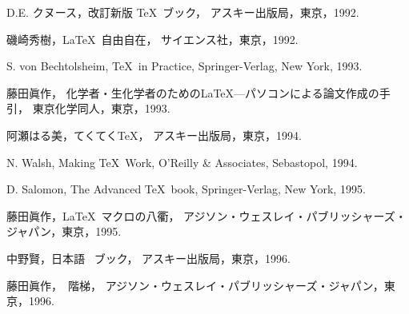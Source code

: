 \documentclass[technicalreport]{ieicej}
\newcommand{\AmSLaTeX}{%
 $\mathcal A$\lower.4ex\hbox{$\!\mathcal M\!$}$\mathcal S$-\LaTeX}
\begin{document}

\begin{thebibliography}{99}





D.E. クヌース，改訂新版 \TeX\ ブック，
アスキー出版局，東京，1992. 

磯崎秀樹，\LaTeX\ 自由自在，
サイエンス社，東京，1992. 


S. von Bechtolsheim, \TeX\ in Practice, 
Springer-Verlag, New York, 1993. 


藤田眞作，
化学者・生化学者のための\LaTeX---パソコンによる論文作成の手引，
東京化学同人，東京，1993. 


阿瀬はる美，てくてく\TeX{}，
アスキー出版局，東京，1994. 

N. Walsh, Making \TeX\ Work, 
O'Reilly \& Associates, Sebastopol, 1994. 

D. Salomon, The Advanced \TeX\ book, 
Springer-Verlag, New York, 1995.

藤田眞作，\LaTeX\ マクロの八衢，
アジソン・ウェスレイ・パブリッシャーズ・ジャパン，東京，1995. 

中野賢，日本語 \LaTeXe\ ブック，
アスキー出版局，東京，1996. 

藤田眞作，\LaTeXe\ 階梯，
アジソン・ウェスレイ・パブリッシャーズ・ジャパン，東京，1996. 


\end{thebibliography}
\end{document}
